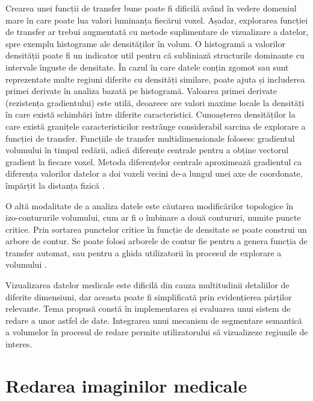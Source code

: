 Crearea unei funcții de transfer bune poate fi dificilă având în vedere domeniul mare în care poate lua valori luminanța fiecărui voxel. Așadar, explorarea funcției de transfer ar trebui augmentată cu metode suplimentare de vizualizare a datelor, spre exemplu histograme ale densităților în volum. O histogramă a valorilor densității poate fi un indicator util pentru că subliniază structurile dominante cu intervale înguste de densitate\cite{inbook}\cite{rezk2006}. În cazul în care datele conțin zgomot sau sunt reprezentate multe regiuni diferite cu densități similare, poate ajuta și includerea primei derivate în analiza bazată pe histogramă. Valoarea primei derivate (rezistența gradientului) este utilă, deoarece are valori maxime locale la densități în care există schimbări între diferite caracteristici\cite{levoy1988}\cite{inbook}\cite{rezk2006}. Cunoașterea densităților la care există granițele caracteristicilor restrânge considerabil sarcina de explorare a funcției de transfer\cite{inbook}. Funcțiile de transfer multidimensionale folosesc gradientul volumului în timpul redării, adică diferențe centrale pentru a obține vectorul gradient la fiecare voxel. Metoda diferențelor centrale aproximează gradientul ca diferența valorilor datelor a doi voxeli vecini de-a lungul unei axe de coordonate, împărțit la distanța fizică \cite{kniss2002}\cite{rezk2006}. 


O altă modalitate de a analiza datele este căutarea modificărilor topologice în izo-contururile volumului, cum ar fi o îmbinare a două contururi, numite puncte critice. Prin sortarea punctelor critice în funcție de densitate se poate construi un arbore de contur. Se poate folosi arborele de contur fie pentru a genera funcția de transfer automat, sau pentru a ghida utilizatorii în procesul de explorare a volumului \cite{inbook}\cite{Zhou2009AutomaticTF}.


Vizualizarea datelor medicale este dificilă din cauza multitudinii detaliilor de diferite dimensiuni, dar aceasta poate fi simplificată prin evidențierea părților relevante. Tema propusă constă în implementarea și evaluarea unui sistem de redare a unor astfel de date. Integrarea unui mecanism de segmentare semantică a volumelor în procesul de redare permite utilizatorului să vizualizeze regiunile de interes.


\section{Redarea imaginilor medicale}

